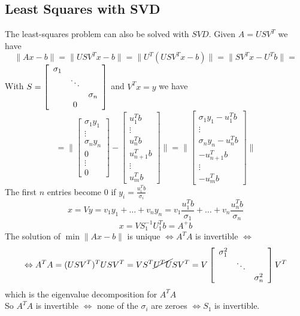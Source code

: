 \documentclass[10pt]{report}
\begin{document}
\subsection{Least Squares with SVD}
The least-squares problem can also be solved with $SVD$. Given $A=USV^T$ we have $$\|Ax-b\| = \|USV^Tx-b\| = \|U^T(USV^Tx - b)\| = \|SV^Tx-U^Tb\| =$$
With $S =\left[\begin{array}{c c c}
\sigma_1\\
& \ddots\\
& & \sigma_n\\
& 0
\end{array}\right]$ and $V^Tx = y$ we have
$$=\|\left[\begin{array}{c}
\sigma_1y_1\\\vdots\\\sigma_ny_n\\0\\\vdots\\0
\end{array}\right] - \left[\begin{array}{c}
u_1^Tb\\\vdots\\u_n^Tb\\u_{n+1}^Tb\\\vdots\\u_m^Tb
\end{array}\right] \| = \|\left[\begin{array}{c}
\sigma_1y_1-u_1^Tb\\\vdots\\\sigma_ny_n-u_n^Tb\\-u_{n+1}^Tb\\\vdots\\-u_m^Tb
\end{array}\right]\|$$
The first $n$ entries become $0$ if $y_i = \frac{u_i^Tb}{\sigma_i}$\\
$$x = Vy = v_1y_1 + \ldots + v_ny_n = v_1\frac{u_1^Tb}{\sigma_1} + \ldots + v_n\frac{u_n^Tb}{\sigma_n}$$
$$x = VS_1^{-1}U_1^Tb = A^+b$$
The solution of $\min \|Ax-b\|$ is unique $\Leftrightarrow A^TA$ is invertible $\Leftrightarrow$ $$\Leftrightarrow A^TA=(USV^T)^TUSV^T = VS^T\cancel{U^TU}SV^T = V\left[\begin{array}{c c c}
\sigma_1^2\\
& \ddots\\
& & \sigma_n^2
\end{array}\right]V^T$$ which is the eigenvalue decomposition for $A^TA$\\
So $A^TA$ is invertible $\Leftrightarrow$ none of the $\sigma_i$ are zeroes $\Leftrightarrow S_1$ is invertible.\\
\end{document}
